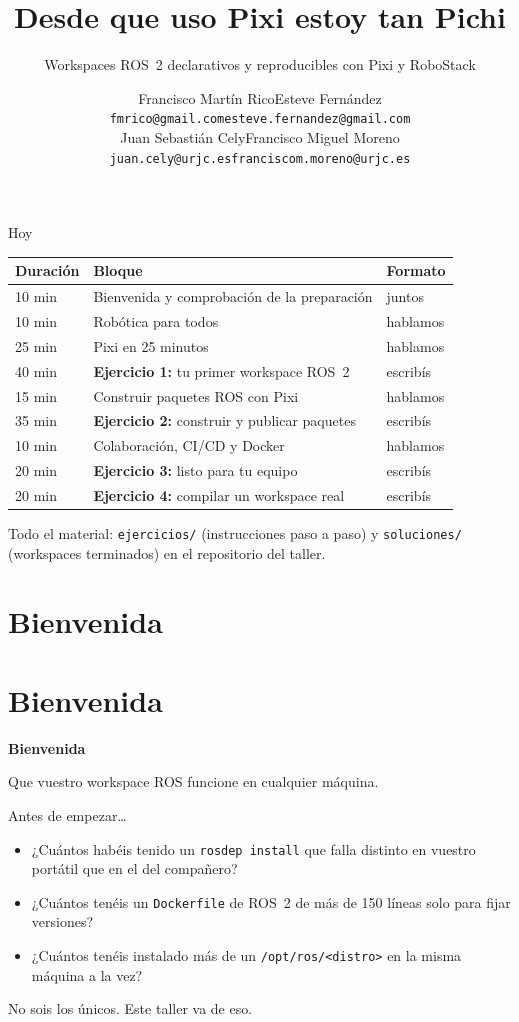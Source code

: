 \documentclass[aspectratio=169]{beamer}
\author[Francisco Martín Rico, Esteve Fernández, Juan Sebastián Cely, Francisco Miguel Moreno]{%
\begin{tabular}{cc}
Francisco Martín Rico & Esteve Fernández \\
\texttt{\footnotesize fmrico@gmail.com} & \texttt{\footnotesize esteve.fernandez@gmail.com} \\[1em]
Juan Sebastián Cely & Francisco Miguel Moreno \\
\texttt{\footnotesize juan.cely@urjc.es} & \texttt{\footnotesize franciscom.moreno@urjc.es}
\end{tabular}%
}
\title[Pixi y RoboStack]{Desde que uso Pixi estoy tan Pichi}
\subtitle{Workspaces ROS~2 declarativos y reproducibles con Pixi y RoboStack}
\institute{}
\date{}
\newcommand{\referencia}[1]{\vfill{\scriptsize\color{halfgray} #1}}
\newcommand{\separador}[2]{%
\begin{frame}
  \centering
  \vfill
  {\usebeamercolor[fg]{structure}\fontsize{34}{40}\selectfont\bfseries #1\par}
  \vspace{1.2em}
  {\Large\color{halfgray} #2\par}
  \vfill
\end{frame}%
}
\newcommand{\seccion}[3][]{%
  \if\relax\detokenize{#1}\relax\section{#2}\else\section[#1]{#2}\fi
  \separador{#2}{#3}%
}
\begin{document}
\begin{frame}
    \titlepage
\end{frame}

\begin{frame}{Hoy}
\centering
\begin{tabular}{lll}
\toprule
\textbf{Duración} & \textbf{Bloque} & \textbf{Formato} \\
\midrule
10 min & Bienvenida y comprobación de la preparación & juntos \\
10 min & Robótica para todos & hablamos \\
25 min & Pixi en 25 minutos & hablamos \\
40 min & \textbf{Ejercicio 1:} tu primer workspace ROS~2 & escribís \\
15 min & Construir paquetes ROS con Pixi & hablamos \\
35 min & \textbf{Ejercicio 2:} construir y publicar paquetes & escribís \\
10 min & Colaboración, CI/CD y Docker & hablamos \\
20 min & \textbf{Ejercicio 3:} listo para tu equipo & escribís \\
20 min & \textbf{Ejercicio 4:} compilar un workspace real & escribís \\
\bottomrule
\end{tabular}
\referencia{Todo el material: \texttt{ejercicios/} (instrucciones paso a paso) y \texttt{soluciones/} (workspaces terminados) en el repositorio del taller.}
\end{frame}

\seccion{Bienvenida}{Que vuestro workspace ROS funcione en cualquier máquina.}

\begin{frame}{Antes de empezar\ldots}
\begin{itemize}
    \item ¿Cuántos habéis tenido un \lstinline|rosdep install| que falla distinto en vuestro portátil que en el del compañero?
    \item ¿Cuántos tenéis un \texttt{Dockerfile} de ROS~2 de más de 150 líneas solo para fijar versiones?
    \item ¿Cuántos tenéis instalado más de un \lstinline|/opt/ros/<distro>| en la misma máquina a la vez?
\end{itemize}
\vfill
\begin{block}{}
\centering No sois los únicos. Este taller va de eso.
\end{block}
\end{frame}
\end{document}

